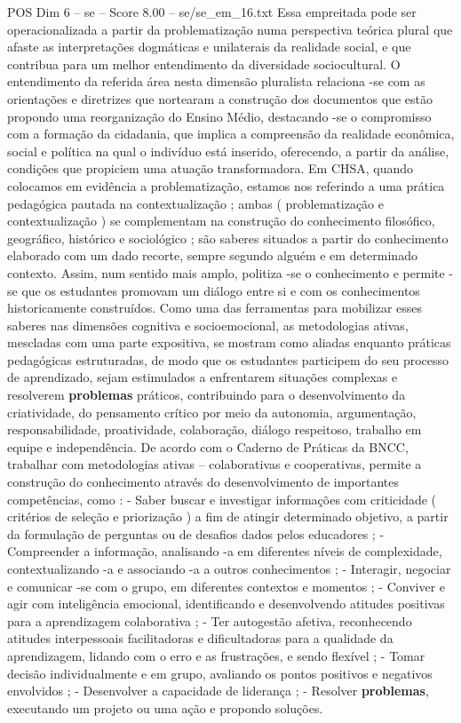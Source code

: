 \begin{textsample}{POS Dim 6 – se – Score 8.00 – se/se\_em\_16.txt}
Essa empreitada pode ser operacionalizada a partir da problematização numa perspectiva teórica plural que afaste as interpretações dogmáticas e unilaterais da realidade social, e que contribua para um melhor entendimento da diversidade sociocultural.
O entendimento da referida área nesta dimensão pluralista relaciona -se com as orientações e diretrizes que nortearam a construção dos documentos que estão propondo uma reorganização do Ensino Médio, destacando -se o compromisso com a formação da cidadania, que implica a compreensão da realidade econômica, social e política na qual o indivíduo está inserido, oferecendo, a partir da análise, condições que propiciem uma atuação transformadora.
Em CHSA, quando colocamos em evidência a problematização, estamos nos referindo a uma prática pedagógica pautada na contextualização ; ambas ( problematização e contextualização ) se complementam na construção do conhecimento filosófico, geográfico, histórico e sociológico ; são saberes situados a partir do conhecimento elaborado com um dado recorte, sempre segundo alguém e em determinado contexto.
Assim, num sentido mais amplo, politiza -se o conhecimento e permite -se que os estudantes promovam um diálogo entre si e com os conhecimentos historicamente construídos.
Como uma das ferramentas para mobilizar esses saberes nas dimensões cognitiva e socioemocional, as metodologias ativas, mescladas com uma parte expositiva, se mostram como aliadas enquanto práticas pedagógicas estruturadas, de modo que os estudantes participem do seu processo de aprendizado, sejam estimulados a enfrentarem situações complexas e resolverem \textbf{problemas} práticos, contribuindo para o desenvolvimento da criatividade, do pensamento crítico por meio da autonomia, argumentação, responsabilidade, proatividade, colaboração, diálogo respeitoso, trabalho em equipe e independência.
De acordo com o Caderno de Práticas da BNCC, trabalhar com metodologias ativas – colaborativas e cooperativas, permite a construção do conhecimento através do desenvolvimento de importantes competências, como : - Saber buscar e investigar informações com criticidade ( critérios de seleção e priorização ) a fim de atingir determinado objetivo, a partir da formulação de perguntas ou de desafios dados pelos educadores ; - Compreender a informação, analisando -a em diferentes níveis de complexidade, contextualizando -a e associando -a a outros conhecimentos ; - Interagir, negociar e comunicar -se com o grupo, em diferentes contextos e momentos ; - Conviver e agir com inteligência emocional, identificando e desenvolvendo atitudes positivas para a aprendizagem colaborativa ; - Ter autogestão afetiva, reconhecendo atitudes interpessoais facilitadoras e dificultadoras para a qualidade da aprendizagem, lidando com o erro e as frustrações, e sendo flexível ; - Tomar decisão individualmente e em grupo, avaliando os pontos positivos e negativos envolvidos ; - Desenvolver a capacidade de liderança ; - Resolver \textbf{problemas}, executando um projeto ou uma ação e propondo soluções.

\end{textsample}

